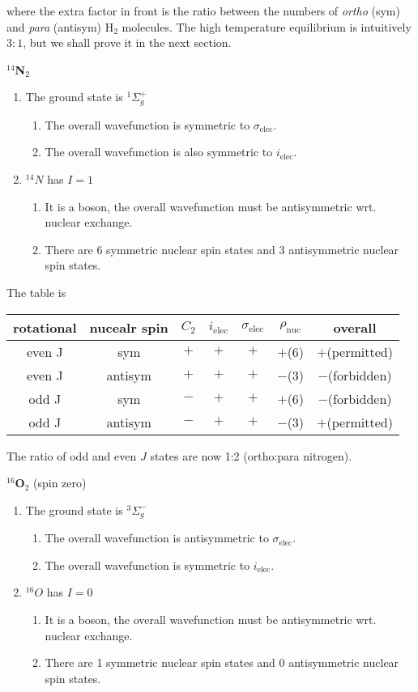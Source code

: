 where the extra factor in front is the ratio between the numbers of \emph{ortho} (sym) and \emph{para} (antisym) H$_2$ molecules. The high temperature equilibrium is intuitively $3:1$, but we shall prove it in the next section.\par
\textbf{$^{14}$N$_2$}
\begin{enumerate}
  \item The ground state is $^1\Sigma_g^+$
  \begin{enumerate}
  \item The overall wavefunction is symmetric to $\sigma_{\text{elec}}$.
  \item The overall wavefunction is also symmetric to $i_{\text{elec}}$.
\end{enumerate}
\item $^{14}N$ has $I=1$
\begin{enumerate}
  \item It is a boson, the overall wavefunction must be antisymmetric wrt. nuclear exchange.
  \item There are 6 symmetric nuclear spin states and 3 antisymmetric nuclear spin states.
\end{enumerate}
\end{enumerate}
The table is 
\begin{center}
\begin{tabular}{cc|cccc|c}
\hline
rotational & nucealr spin & $C_2$ & $i_{\text{elec}}$ & $\sigma_{\text{elec}}$ & $\rho_{\text{nuc}}$ & overall\\
\hline
even J & sym & $+$ & $+$ & $+$ & $+$(6) & $+$(permitted)\\
even J & antisym & $+$ & $+$ & $+$ & $-$(3) & $-$(forbidden)\\
odd J & sym & $-$ & $+$ & $+$ & $+$(6) & $-$(forbidden)\\
odd J & antisym & $-$ & $+$ & $+$ & $-$(3) & $+$(permitted)\\
\hline
\end{tabular}
\end{center}
The ratio of odd and even $J$ states are now 1:2 (ortho:para nitrogen).\par
\textbf{$^{16}$O$_2$} (spin zero)
\begin{enumerate}
  \item The ground state is $^3\Sigma_g^-$
  \begin{enumerate}
  \item The overall wavefunction is antisymmetric to $\sigma_{\text{elec}}$.
  \item The overall wavefunction is symmetric to $i_{\text{elec}}$.
\end{enumerate}
\item $^{16}O$ has $I=0$
\begin{enumerate}
  \item It is a boson, the overall wavefunction must be antisymmetric wrt. nuclear exchange.
  \item There are 1 symmetric nuclear spin states and 0 antisymmetric nuclear spin states.
\end{enumerate}
\end{enumerate}
